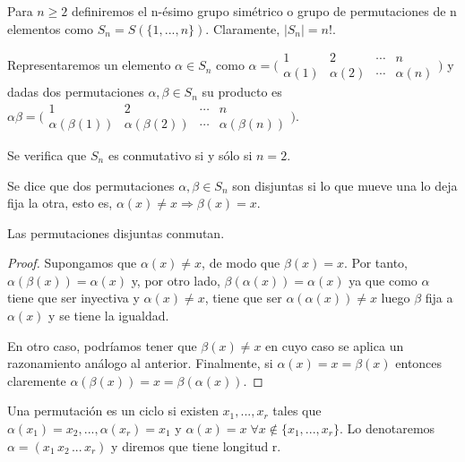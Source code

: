 Para $n \ge 2$ definiremos el n-ésimo grupo simétrico o grupo de permutaciones de n elementos como $S_n = S(\{1,...,n\})$. Claramente, $|S_n| = n!$.

Representaremos un elemento $\alpha \in S_n$ como 
$\alpha = \bigl(\begin{smallmatrix}
  1 & 2 & \cdots & n \\
  \alpha(1) & \alpha(2) & \cdots & \alpha(n) 
\end{smallmatrix}\bigr)$
y dadas dos permutaciones $\alpha,\beta \in S_n$ su producto es 
$\alpha \beta = \bigl(\begin{smallmatrix}
  1 & 2 & \cdots & n \\
  \alpha(\beta(1)) & \alpha(\beta(2)) & \cdots & \alpha(\beta(n)) 
\end{smallmatrix}\bigr)$.

Se verifica que $S_n$ es conmutativo si y sólo si $n=2$.

\begin{definition}
Se dice que dos permutaciones $\alpha,\beta \in S_n$ son disjuntas si lo que mueve una lo deja fija la otra, esto es, $\alpha(x) \neq x \Rightarrow \beta(x) = x$.
\end{definition}

\begin{proposition}
Las permutaciones disjuntas conmutan.
\end{proposition}
\begin{proof}
Supongamos que $	\alpha(x) \neq x$, de modo que $\beta(x) = x$. Por tanto, $\alpha(\beta(x)) = \alpha(x)$ y, por otro lado, $\beta(\alpha(x)) = \alpha(x)$ ya que como $\alpha$ tiene que ser inyectiva y $\alpha(x) \neq x$, tiene que ser $\alpha(\alpha(x)) \neq x$ luego $\beta$ fija a $\alpha(x)$ y se tiene la igualdad.

En otro caso, podríamos tener que $\beta(x) \neq x$ en cuyo caso se aplica un razonamiento análogo al anterior. Finalmente, si $\alpha(x) = x = \beta(x)$ entonces claremente $\alpha(\beta(x)) = x = \beta(\alpha(x))$.
\end{proof}

\begin{definition}[Ciclo]
Una permutación es un ciclo si existen $x_1,...,x_r$ tales que $\alpha(x_1) = x_2,...,\alpha(x_r) = x_1$ y $\alpha(x) = x \; \forall x \notin \{x_1,...,x_r\}$. Lo denotaremos $\alpha = (x_1 \, x_2 \, ... \, x_r)$ y diremos que tiene longitud r. 
\end{definition}

